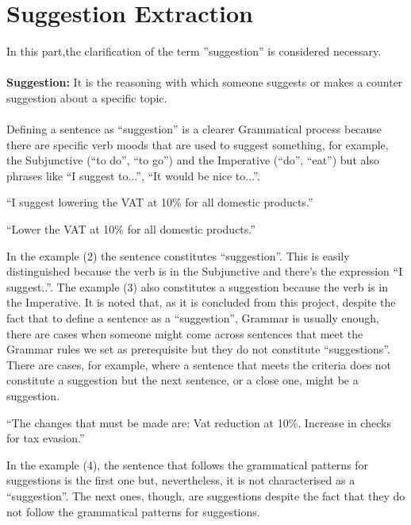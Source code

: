\section{Suggestion Extraction}
In this part,the clarification of the term ''suggestion'' is considered necessary.\\
\\
\textbf{Suggestion:} It is the reasoning with which someone suggests or makes a counter suggestion about a specific topic.\\
\\
Defining a sentence as ``suggestion'' is a clearer Grammatical process because there are specific verb moods that are used to suggest something, for example, the Subjunctive (``to do'', ``to go'') and the  Imperative (``do'', ``eat'') but also phrases like ``I suggest  to...'', ``It would be nice to...''.\\
\begin{example}
	``I suggest lowering the VAT at 10\% for all domestic products.''\\
\end{example}
\begin{example}
	``Lower the VAT at 10\% for all domestic products.''\\
\end{example}

In the example (2) the sentence constitutes  ``suggestion''. This is easily distinguished because the verb is in the Subjunctive and there's the expression ``I suggest..''. The example (3) also constitutes a suggestion because the verb is in the Imperative. It is noted that, as it is concluded from this project, despite the fact that to define a sentence as a ``suggestion'', Grammar is usually enough, there are cases when someone might come across sentences that meet the Grammar rules we set as prerequisite but they do not constitute  ``suggestions''. There are cases, for example, where a sentence that meets the criteria does not constitute a suggestion but the next sentence, or a close one, might be a suggestion.\\
\begin{example}
	``The changes that must be made are: Vat reduction at 10\%. Increase in checks for tax evasion.''\\
\end{example}
In the example (4), the sentence that follows the grammatical patterns for suggestions is the first one but, nevertheless, it is not characterised as a ``suggestion''. The next ones, though, are suggestions despite the fact that they do not follow the grammatical patterns for suggestions.





